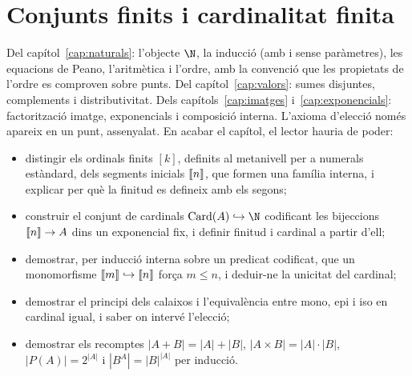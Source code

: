\chapter{Conjunts finits i cardinalitat finita}\label{cap:finits}

\begin{objectius}
 Del capítol~\ref{cap:naturals}: l'objecte \(\N\), la inducció (amb i sense paràmetres), les equacions de Peano, l'aritmètica i l'ordre, amb la convenció que les propietats de l'ordre es comproven sobre punts. Del capítol~\ref{cap:valors}: sumes disjuntes, complements i distributivitat. Dels capítols~\ref{cap:imatges} i~\ref{cap:exponencials}: factorització imatge, exponencials i composició interna. L'axioma d'elecció només apareix en un punt, assenyalat.
 En acabar el capítol, el lector hauria de poder:
\begin{itemize}
  \item distingir els ordinals finits \([k]\), definits al metanivell per a numerals estàndard, dels segments inicials \(\llbracket n\rrbracket\), que formen una família interna, i explicar per què la finitud es defineix amb els segons;
  \item construir el conjunt de cardinals \(\operatorname{Card}(A)\hookrightarrow\N\) codificant les bijeccions \(\llbracket n\rrbracket\to A\) dins un exponencial fix, i definir finitud i cardinal a partir d'ell;
  \item demostrar, per inducció interna sobre un predicat codificat, que un monomorfisme \(\llbracket m\rrbracket\hookrightarrow\llbracket n\rrbracket\) força \(m\le n\), i deduir-ne la unicitat del cardinal;
  \item demostrar el principi dels calaixos i l'equivalència entre mono, epi i iso en cardinal igual, i saber on intervé l'elecció;
  \item demostrar els recomptes \(|A+B|=|A|+|B|\), \(|A\times B|=|A|\cdot|B|\), \(|P(A)|=2^{|A|}\) i \(|B^A|=|B|^{|A|}\) per inducció.
\end{itemize}
\end{objectius}

